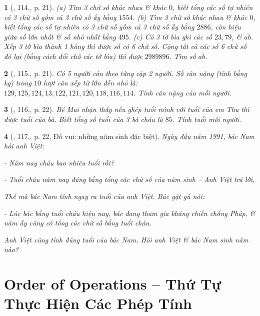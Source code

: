 \documentclass{article}
\newtheorem{baitoan}{}
\begin{document}
\begin{baitoan}[\cite{Binh_Toan_6_tap_1}, 114., p. 21]
	(a) Tìm 3 chữ số khác nhau \& khác $0$, biết tổng các số tự nhiên có 3 chữ số gồm cả 3 chữ số ấy bằng $1554$. (b) Tìm 3 chữ số khác nhau \& khác $0$, biết tổng các số tự nhiên có 3 chữ số gồm cả 3 chữ số ấy bằng $2886$, còn hiệu giữa số lớn nhất \& số nhỏ nhất bằng $495$. (c) Có 3 tờ bìa ghi các số $23,79$, \& $\overline{ab}$. Xếp 3 tờ bìa thành 1 hàng thì được số có 6 chữ số. Cộng tất cả các số 6 chữ số đó lại (bằng cách đổi chỗ các tờ bìa) thì được $2989896$. Tìm số $\overline{ab}$.
\end{baitoan}

\begin{baitoan}[\cite{Binh_Toan_6_tap_1}, 115., p. 21]
	Có 5 người cân theo từng cặp 2 người. Số cân nặng (tính bằng {\rm kg}) trong $10$ lượt cân xếp từ lớn đến nhỏ là: $129,125,124,13,122,121,120,118,116,114$. Tính cân nặng của mỗi người.
\end{baitoan}

\begin{baitoan}[\cite{Binh_Toan_6_tap_1}, 116., p. 22]
	Bé Mai nhận thấy nếu ghép tuổi mình với tuổi của em Thu thì được tuổi của bà. Biết tổng số tuổi của 3 bà cháu là $85$. Tính tuổi mỗi người.
\end{baitoan}

\begin{baitoan}[\cite{Binh_Toan_6_tap_1}, 117., p. 22, Đố vui: những năm sinh đặc biệt]
	Ngày đầu năm 1991, bác Nam hỏi anh Việt:
	
	- Năm nay cháu bao nhiêu tuổi rồi?
	
	- Tuổi cháu năm nay đúng bằng tổng các chữ số của năm sinh -- Anh Việt trả lời.
	
	Thế mà bác Nam tính ngay ra tuổi của anh Việt. Bác gật gù nói:
	
	- Lúc bác bằng tuổi cháu hiện nay, bác đang tham gia kháng chiến chống Pháp, \& năm ấy cũng có tổng các chữ số bằng tuổi cháu.
	
	Anh Việt cũng tính đúng tuổi của bác Nam. Hỏi anh Việt \& bác Nam sinh năm nào?
\end{baitoan}


\section{Order of Operations -- Thứ Tự Thực Hiện Các Phép Tính}
\end{document}
